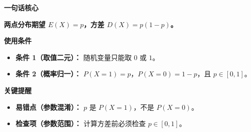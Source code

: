 \begin{summarybox}

	\textbf{\textcolor{CSummary}{一句话核心}}

	\textbf{两点分布期望 $E(X)=p$，方差 $D(X)=p(1-p)$。}

	\medskip
	\textbf{\textcolor{CSummary}{使用条件}}
	\begin{itemize}[leftmargin=*, itemsep=0.5em, topsep=0.4em]
		\item \textbf{条件 1（取值二元）：} 随机变量只能取 $0$ 或 $1$。
		\item \textbf{条件 2（概率归一）：} $P(X=1)=p$，$P(X=0)=1-p$，且 $p\in[0,1]$。
	\end{itemize}

	\medskip
	\textbf{\textcolor{CSummary}{关键提醒}}
	\begin{itemize}[leftmargin=*, itemsep=0.5em, topsep=0.4em]
		\item \textbf{易错点（参数混淆）：} $p$ 是 $P(X=1)$，不是 $P(X=0)$。
		\item \textbf{检查项（参数范围）：} 计算方差前必须检查 $p\in[0,1]$。
	\end{itemize}

\end{summarybox}
